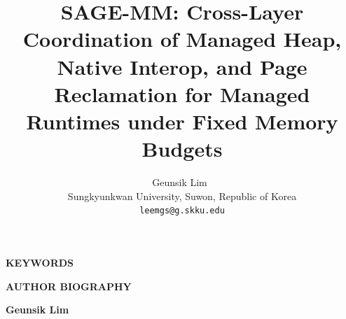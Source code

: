 \documentclass[11pt]{article}
\begin{document}
\title{\textbf{SAGE-MM: Cross-Layer Coordination of Managed Heap, Native
Interop, and Page Reclamation for Managed Runtimes under Fixed Memory Budgets}}

\author{Geunsik Lim~\\[4pt]
  \normalsize Sungkyunkwan University, Suwon, Republic of Korea\\
  \normalsize \texttt{leemgs@g.skku.edu}}
\date{}

\maketitle


\begin{abstract}
\noindent

\end{abstract}

\medskip
\noindent\textbf{KEYWORDS}\\

\medskip






\vspace{1em}
\noindent\textbf{AUTHOR BIOGRAPHY}

\medskip
\noindent\textbf{Geunsik Lim} 
\end{document}
